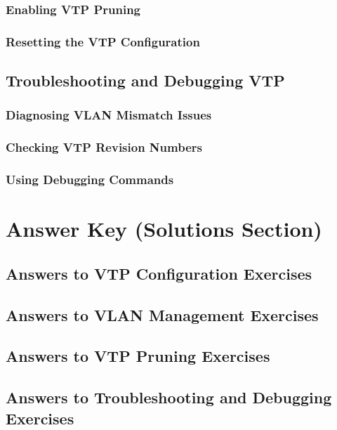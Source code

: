\documentclass{book}
\begin{document}
\subsection{Enabling VTP Pruning}
\subsection{Resetting the VTP Configuration}

\section{Troubleshooting and Debugging VTP}
\subsection{Diagnosing VLAN Mismatch Issues}
\subsection{Checking VTP Revision Numbers}
\subsection{Using Debugging Commands}

\chapter{Answer Key (Solutions Section)}
\section{Answers to VTP Configuration Exercises}
\section{Answers to VLAN Management Exercises}
\section{Answers to VTP Pruning Exercises}
\section{Answers to Troubleshooting and Debugging Exercises}
\end{document}

